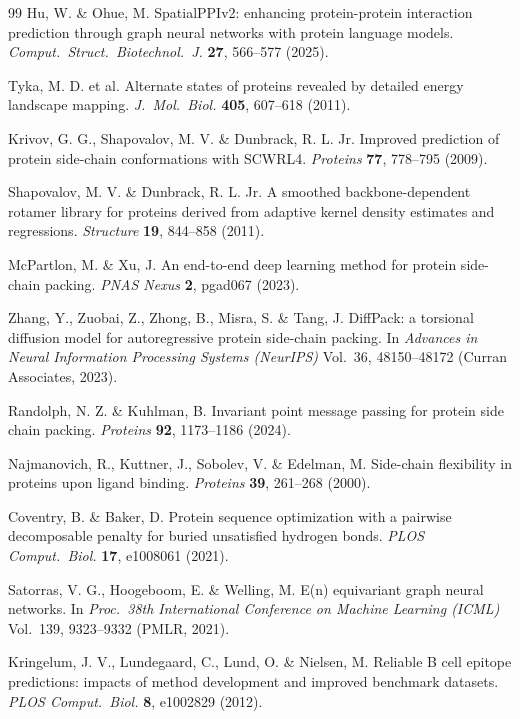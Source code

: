 \documentclass[10pt,twocolumn]{article}
\begin{document}
\begin{thebibliography}{99}
Hu, W. \& Ohue, M. SpatialPPIv2: enhancing protein-protein interaction prediction through graph neural networks with protein language models. \textit{Comput.\ Struct.\ Biotechnol.\ J.} \textbf{27}, 566--577 (2025).

Tyka, M. D. et al. Alternate states of proteins revealed by detailed energy landscape mapping. \textit{J.\ Mol.\ Biol.} \textbf{405}, 607--618 (2011).

Krivov, G. G., Shapovalov, M. V. \& Dunbrack, R. L. Jr. Improved prediction of protein side-chain conformations with SCWRL4. \textit{Proteins} \textbf{77}, 778--795 (2009).

Shapovalov, M. V. \& Dunbrack, R. L. Jr. A smoothed backbone-dependent rotamer library for proteins derived from adaptive kernel density estimates and regressions. \textit{Structure} \textbf{19}, 844--858 (2011).

McPartlon, M. \& Xu, J. An end-to-end deep learning method for protein side-chain packing. \textit{PNAS Nexus} \textbf{2}, pgad067 (2023).

Zhang, Y., Zuobai, Z., Zhong, B., Misra, S. \& Tang, J. DiffPack: a torsional diffusion model for autoregressive protein side-chain packing. In \textit{Advances in Neural Information Processing Systems (NeurIPS)} Vol.\ 36, 48150--48172 (Curran Associates, 2023).

Randolph, N. Z. \& Kuhlman, B. Invariant point message passing for protein side chain packing. \textit{Proteins} \textbf{92}, 1173--1186 (2024).

Najmanovich, R., Kuttner, J., Sobolev, V. \& Edelman, M. Side-chain flexibility in proteins upon ligand binding. \textit{Proteins} \textbf{39}, 261--268 (2000).

Coventry, B. \& Baker, D. Protein sequence optimization with a pairwise decomposable penalty for buried unsatisfied hydrogen bonds. \textit{PLOS Comput.\ Biol.} \textbf{17}, e1008061 (2021).

Satorras, V. G., Hoogeboom, E. \& Welling, M. E(n) equivariant graph neural networks. In \textit{Proc.\ 38th International Conference on Machine Learning (ICML)} Vol.\ 139, 9323--9332 (PMLR, 2021).

Kringelum, J. V., Lundegaard, C., Lund, O. \& Nielsen, M. Reliable B cell epitope predictions: impacts of method development and improved benchmark datasets. \textit{PLOS Comput.\ Biol.} \textbf{8}, e1002829 (2012).


\end{thebibliography}
\end{document}
